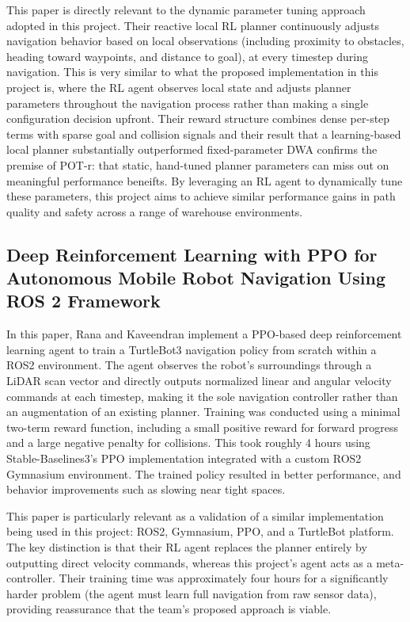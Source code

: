 \documentclass[conference]{IEEEtran}
\begin{document}
        This paper is directly relevant to the dynamic parameter tuning approach adopted in this project. Their reactive local RL planner continuously adjusts navigation behavior based on local observations (including proximity to obstacles, heading toward waypoints, and distance to goal), at every timestep during navigation. This is very similar to what the proposed implementation in this project is, where the RL agent observes local state and adjusts planner parameters throughout the navigation process rather than making a single configuration decision upfront. Their reward structure combines dense per-step terms with sparse goal and collision signals and their result that a learning-based local planner substantially outperformed fixed-parameter DWA confirms the premise of POT-r: that static, hand-tuned planner parameters can miss out on meaningful performance beneifts. By leveraging an RL agent to dynamically tune these parameters, this project aims to achieve similar performance gains in path quality and safety across a range of warehouse environments.

        \subsection{Deep Reinforcement Learning with PPO for Autonomous Mobile Robot Navigation Using ROS 2 Framework \cite{b10}}
        In this paper, Rana and Kaveendran implement a PPO-based deep reinforcement learning agent to train a TurtleBot3 navigation policy from scratch within a ROS2 environment. The agent observes the robot's 
        surroundings through a LiDAR scan vector and directly outputs normalized linear and angular velocity commands at each timestep, making it the sole navigation controller rather than an augmentation of an 
        existing planner. Training was conducted using a minimal two-term reward function, including a small positive reward for forward progress and a large negative penalty for collisions. This took roughly 4 hours using Stable-Baselines3's PPO implementation integrated with a custom ROS2 Gymnasium environment. The trained policy resulted in better performance, and behavior improvements such as slowing near tight spaces. 

        This paper is particularly relevant as a validation of a similar implementation being used in this project: ROS2, Gymnasium, PPO, and a TurtleBot platform. The key distinction is that their RL agent replaces the planner entirely by outputting direct velocity commands, whereas this project's agent acts as a meta-controller. Their training time was approximately four hours for a significantly harder problem (the agent must learn full navigation from raw sensor data), providing reassurance that the team's proposed approach is viable.
\end{document}
